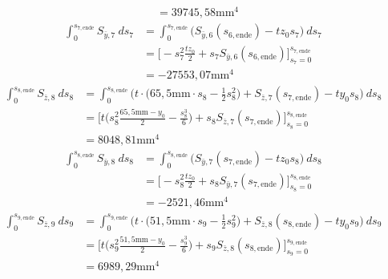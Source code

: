 \begin{itemize}
\begin{equation}
\begin{split}
			&=39745,58\mathrm{mm}^4
		\end{split}
	\end{equation}
	\begin{equation}
		\begin{split}
			\int_{0}^{s_{7,\mathrm{ende}}} S_{\bar y,7}\ ds_7 &= \int_{0}^{s_{7,\mathrm{ende}}} \bigg(S_{\bar y,6}(s_{6,\mathrm{ende}})-tz_0s_7\bigg)\ ds_7\\\
			&=\bigg[-s_7^2\frac{tz_0}{2}+s_7S_{\bar y,6}(s_{6,\mathrm{ende}})\bigg]_{s_7=0}^{s_{7,\mathrm{ende}}}\\\
			&=-27553,07\mathrm{mm}^4
		\end{split}
	\end{equation}
	\begin{equation}
		\begin{split}
			\int_{0}^{s_{8,\mathrm{ende}}} S_{\bar z,8}\ ds_8 &= \int_{0}^{s_{8,\mathrm{ende}}} \bigg(t\cdot\bigg(65,5\mathrm{mm}\cdot s_8-\frac{1}{2}s^2_8\bigg) + S_{\bar z,7}(s_{7,\mathrm{ende}})-ty_0s_8\bigg)\ ds_8\\\
			&=\bigg[t\bigg(s_8^2\frac{65,5\mathrm{mm}-y_0}{2}-\frac{s_8^3}{6}\bigg)+s_8S_{\bar z,7}(s_{7,\mathrm{ende}})\bigg]_{s_8=0}^{s_{8,\mathrm{ende}}}\\\
			&=8048,81\mathrm{mm}^4
		\end{split}
	\end{equation}
	\begin{equation}
		\begin{split}
			\int_{0}^{s_{8,\mathrm{ende}}} S_{\bar y,8}\ ds_8 &= \int_{0}^{s_{8,\mathrm{ende}}} \bigg(S_{\bar y,7}(s_{7,\mathrm{ende}})-tz_0s_8\bigg)\ ds_8\\\
			&=\bigg[-s_8^2\frac{tz_0}{2}+s_8S_{\bar y,7}(s_{7,\mathrm{ende}})\bigg]_{s_8=0}^{s_{8,\mathrm{ende}}}\\\
			&=-2521,46\mathrm{mm}^4
		\end{split}
	\end{equation}
	\begin{equation}
		\begin{split}
			\int_{0}^{s_{9,\mathrm{ende}}} S_{\bar z,9}\ ds_9 &= \int_{0}^{s_{9,\mathrm{ende}}} \bigg(t\cdot\bigg(51,5\mathrm{mm}\cdot s_9-\frac{1}{2}s^2_9\bigg) + S_{\bar z,8}(s_{8,\mathrm{ende}})-ty_0s_9\bigg)\ ds_9\\\
			&=\bigg[t\bigg(s_9^2\frac{51,5\mathrm{mm}-y_0}{2}-\frac{s_9^3}{6}\bigg)+s_9S_{\bar z,8}(s_{8,\mathrm{ende}})\bigg]_{s_9=0}^{s_{9,\mathrm{ende}}}\\\
			&=6989,29\mathrm{mm}^4
		\end{split}

\end{equation}
\end{itemize}

